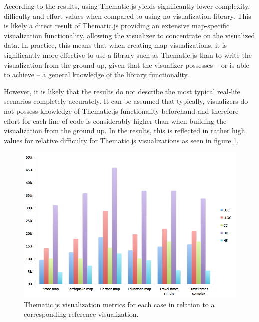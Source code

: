 According to the results, using Thematic.js yields significantly lower complexity, difficulty and effort values when compared to using no visualization library. This is likely a direct result of Thematic.js providing an extensive map-specific visualization functionality, allowing the visualizer to concentrate on the visualized data. In practice, this means that when creating map visualizations, it is significantly more effective to use a library such as Thematic.js than to write the visualization from the ground up, given that the visualizer possesses -- or is able to achieve -- a general knowledge of the library functionality.


However, it is likely that the results do not describe the most typical real-life scenarios completely accurately. It can be assumed that typically, visualizers do not possess knowledge of Thematic.js functionality beforehand and therefore effort for each line of code is considerably higher than when building the visualization from the ground up. In the results, this is reflected in rather high values for relative difficulty for Thematic.js visualizations as seen in figure \ref{fig:evaluationchart}.


\begin{figure}[htbp]
  \begin{center}
    \includegraphics[width=\textwidth]{images/evaluation-results.png}
    \caption{Thematic.js visualization metrics for each case in relation to a corresponding reference visualization.  }
    \label{fig:evaluationchart}
  \end{center}
\end{figure}

